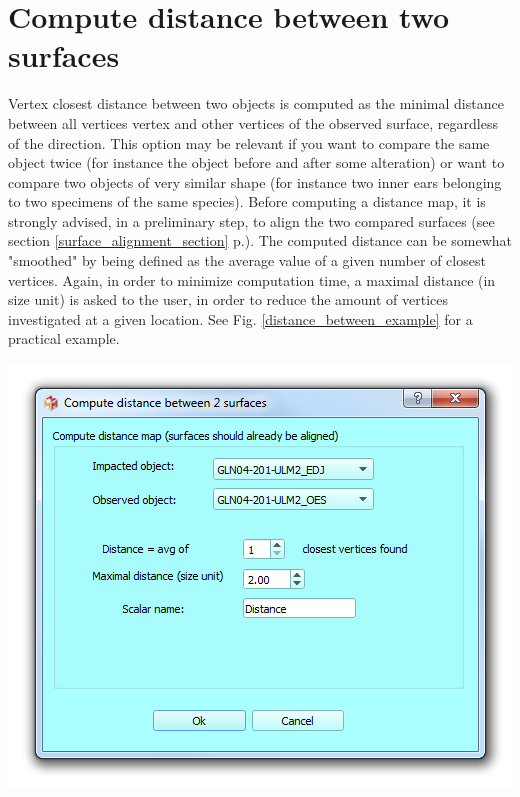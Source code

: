 \section{Compute distance between two surfaces}
\noindent
\begin{minipage}{0.5\textwidth}
Vertex closest distance between two objects is computed as the minimal distance between all vertices  vertex and other vertices of the observed surface, regardless of the direction. This option may be relevant if you want to compare the same object twice (for instance the object before and after some alteration) or want to compare two objects of very similar shape (for instance two inner ears belonging to two specimens of the same species). Before computing a distance map, it is strongly advised, in a preliminary step, to align the two compared surfaces (see section \ref{surface_alignment_section} p.\pageref{surface_alignment_section}). The computed distance can be somewhat "smoothed" by being defined as the average value of a given number of closest vertices. Again, in order to minimize computation time, a maximal distance (in size unit) is asked to the user, in order to reduce the amount of vertices investigated at a given location. See Fig. \ref{distance_between_example} for a practical example.
\end{minipage}    
\begin{minipage}{0.5\textwidth}\centering
  \includegraphics[scale=0.5]{images/11/distance_between_dialog.png}
\label{distance_between_dialog}
 \end{minipage} 
\noindent


